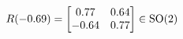 \documentclass[preview]{standalone}
\begin{document}
\begin{align*}
\special{dvisvgm:raw <g id='unique000'>}R(-0.69) = \begin{bmatrix} 0.77 & 0.64 \\ -0.64 & 0.77 \end{bmatrix} \in \text{SO}(2)\special{dvisvgm:raw </g>}
\end{align*}
\end{document}
